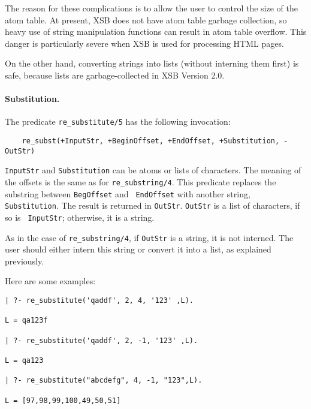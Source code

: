 The reason for these complications is to allow the user to control the size
of the atom table. At present, XSB does not have atom table garbage
collection, so heavy use of string manipulation functions can result in
atom table overflow. This danger is particularly severe when XSB is used
for processing HTML pages.

On the other hand, converting strings into lists (without interning them
first) is safe, because lists are garbage-collected in XSB Version 2.0.

\paragraph{Substitution.}
The predicate \verb|re_substitute/5| has the following invocation:
\begin{verbatim}
    re_subst(+InputStr, +BeginOffset, +EndOffset, +Substitution, -OutStr)  
\end{verbatim}
{\tt InputStr} and {\tt Substitution} can be atoms or lists of characters.
The meaning of the offsets is the same as for {\tt re\_substring/4}.
This predicate replaces the substring between {\tt BegOffset} and {\tt
EndOffset} with another string, {\tt Substitution}. The result is returned
in {\tt OutStr}. {\tt OutStr} is a list of characters, if so is {\tt
InputStr}; otherwise, it is a string.

As in the case of {\tt re\_substring/4}, if {\tt OutStr} is a string, it is
not interned.  The user should either intern this string or convert it into
a list, as explained previously.

Here are some examples:
\begin{verbatim}
| ?- re_substitute('qaddf', 2, 4, '123' ,L).

L = qa123f

| ?- re_substitute('qaddf', 2, -1, '123' ,L).

L = qa123

| ?- re_substitute("abcdefg", 4, -1, "123",L).

L = [97,98,99,100,49,50,51]
\end{verbatim}

